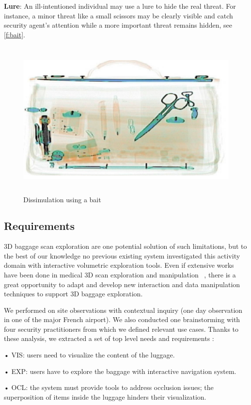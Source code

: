 \textbf{Lure}: An ill-intentioned individual may use a lure to hide the real threat. For instance, a minor threat like a small scissors may be clearly visible and catch security agent's attention while a more important threat remains hidden, see  \autoref{f:bait}.
\begin{figure}
\centering
	\includegraphics[height=8cm]{Figures/bait}
	\caption{Dissimulation using a bait}
	\label{f:bait}
\end{figure}

\subsection{ Requirements }


3D baggage scan exploration are one potential solution of such limitations, but to the best of our knowledge no previous existing system investigated this activity domain with interactive volumetric exploration tools. Even if extensive works have been done in medical 3D scan exploration and manipulation ~\cite{preim2013visual}, there is a great opportunity to adapt and develop new interaction and data manipulation techniques to support 3D baggage exploration.

We performed on site observations with contextual inquiry (one day observation in one of the major French airport). We also conducted one brainstorming with four security practitioners from which we defined relevant use cases. Thanks to these analysis, we extracted a set of top level needs and requirements :

•	VIS: users need to visualize the content of the luggage.

•	EXP: users have to explore the baggage with interactive navigation system.

•	OCL: the system must provide tools to address occlusion issues; the
superposition of items inside the luggage hinders their visualization.

